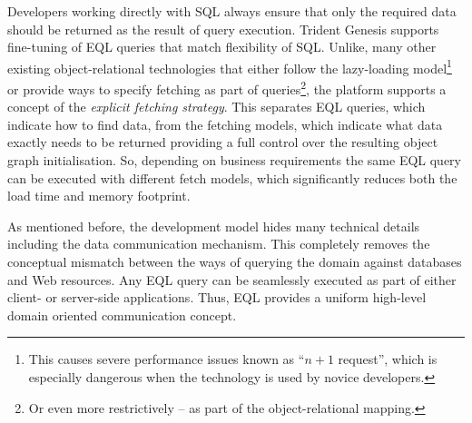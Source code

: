   Developers working directly with SQL always ensure that only the required data should be returned as the result of query execution.  
  Trident Genesis supports fine-tuning of EQL queries that match flexibility of SQL.
  Unlike, many other existing object-relational technologies that either follow the lazy-loading model\footnote{
  This causes severe performance issues known as ``$n+1$ request'', which is especially dangerous when the technology is used by novice developers.}
  or provide ways to specify fetching as part of queries\footnote{Or even more restrictively -- as part of the object-relational mapping.}, the platform supports a concept of the \emph{explicit fetching strategy}.
  This separates EQL queries, which indicate how to find data, from the fetching models, which indicate what data exactly needs to be returned providing a full control over the resulting object graph initialisation.
  So, depending on business requirements the same EQL query can be executed with different fetch models, which significantly reduces both the load time and memory footprint.

  As mentioned before, the development model hides many technical details including the data communication mechanism.
  This completely removes the conceptual mismatch between the ways of querying the domain against databases and Web resources.
  Any EQL query can be seamlessly executed as part of either client- or server-side applications.
  Thus, EQL provides a uniform high-level domain oriented communication concept.